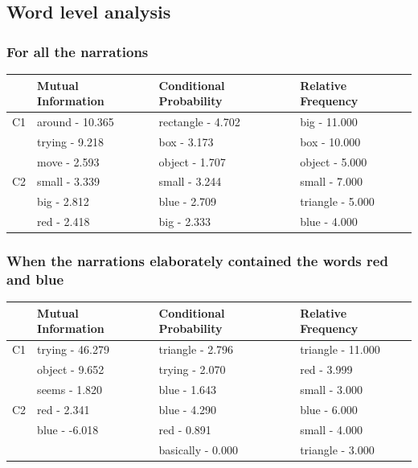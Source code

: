 \documentclass[12pt, a4paper]{report}
\begin{document}
\subsection{Word level analysis}
\vspace*{10px}
\subsubsection{For all the narrations}
\vspace*{10px}
\begin{tabularx}{\textwidth}{ l | X | X | X }
& Mutual Information & Conditional Probability & Relative Frequency\\
\hline
C1 & around - 10.365 & rectangle - 4.702 & big - 11.000\\
& trying - 9.218 & box - 3.173 & box - 10.000\\
& move - 2.593 & object - 1.707 & object - 5.000\\
\hline
C2 & small - 3.339 & small - 3.244 & small - 7.000\\
& big - 2.812 & blue - 2.709 & triangle - 5.000\\
& red - 2.418 & big - 2.333 & blue - 4.000\\
\end{tabularx}

\subsubsection{When the narrations elaborately contained the words \textbf{red} and \textbf{blue}}
\vspace*{10px}
\begin{tabularx}{\textwidth}{ l | X | X | X }
& Mutual Information & Conditional Probability & Relative Frequency\\
\hline
C1 & trying - 46.279 & triangle - 2.796 & triangle - 11.000\\
& object - 9.652 & trying - 2.070 & red - 3.999\\
& seems - 1.820 & blue - 1.643 & small - 3.000\\
\hline
C2 & red - 2.341 & blue - 4.290 & blue - 6.000\\
& blue - -6.018 & red - 0.891 & small - 4.000\\
& & basically - 0.000 & triangle - 3.000\\
\end{tabularx}
\end{document}
